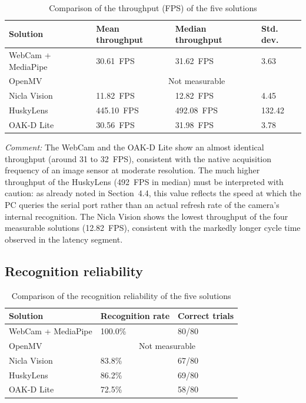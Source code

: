 \documentclass[12pt,a4paper]{report}
\begin{document}
	\begin{table}[H]
		\centering
		\small
		\renewcommand{\arraystretch}{1.2}
		\begin{tabularx}{\textwidth}{|l|X|X|X|}
			\hline
			\textbf{Solution} & \textbf{Mean throughput} & \textbf{Median throughput} & \textbf{Std. dev.} \\
			\hline
			WebCam + MediaPipe & 30.61~FPS & 31.62~FPS & 3.63 \\
			\hline
			OpenMV & \multicolumn{3}{c|}{Not measurable} \\
			\hline
			Nicla Vision & 11.82~FPS & 12.82~FPS & 4.45 \\
			\hline
			HuskyLens & 445.10~FPS & 492.08~FPS & 132.42 \\
			\hline
			OAK-D Lite & 30.56~FPS & 31.98~FPS & 3.78 \\
			\hline
		\end{tabularx}
		\caption{Comparison of the throughput (FPS) of the five solutions}
		\label{tab:comparatif-fps}
	\end{table}
	
	\noindent\textit{Comment:} The WebCam and the OAK-D Lite show an almost identical throughput (around 31 to 32~FPS), consistent with the native acquisition frequency of an image sensor at moderate resolution. The much higher throughput of the HuskyLens (492~FPS in median) must be interpreted with caution: as already noted in Section~4.4, this value reflects the speed at which the PC queries the serial port rather than an actual refresh rate of the camera's internal recognition. The Nicla Vision shows the lowest throughput of the four measurable solutions (12.82~FPS), consistent with the markedly longer cycle time observed in the latency segment.
	
	\subsection*{Recognition reliability}
	
	\begin{table}[H]
		\centering
		\small
		\renewcommand{\arraystretch}{1.2}
		\begin{tabularx}{\textwidth}{|l|X|X|}
			\hline
			\textbf{Solution} & \textbf{Recognition rate} & \textbf{Correct trials} \\
			\hline
			WebCam + MediaPipe & 100.0\% & 80/80 \\
			\hline
			OpenMV & \multicolumn{2}{c|}{Not measurable} \\
			\hline
			Nicla Vision & 83.8\% & 67/80 \\
			\hline
			HuskyLens & 86.2\% & 69/80 \\
			\hline
			OAK-D Lite & 72.5\% & 58/80 \\
			\hline
		\end{tabularx}
		\caption{Comparison of the recognition reliability of the five solutions}
		\label{tab:comparatif-fiabilite}
	\end{table}
	
\end{document}
